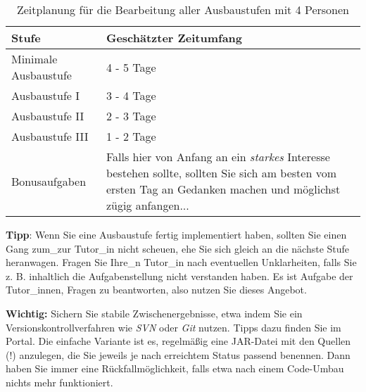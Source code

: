 \begin{table}[htb]
\begin{center}
\begin{tabular}{|p{}|p{}|}\hline
\textbf{Stufe} & \textbf{Gesch\"atzter Zeitumfang}\\\hline\hline
   Minimale Ausbaustufe & 4 - 5 Tage \\\hline

   Ausbaustufe I & 3 - 4 Tage \\\hline

   Ausbaustufe II & 2 - 3 Tage \\\hline

   Ausbaustufe III & 1 - 2 Tage \\\hline

   Bonusaufgaben & Falls hier von Anfang an ein \emph{starkes} Interesse bestehen
   sollte, sollten Sie sich am besten vom ersten Tag an Gedanken machen und m\"oglichst z\"ugig anfangen...\\\hline
\end{tabular}
\caption{Zeitplanung f\"ur die Bearbeitung aller Ausbaustufen mit 4 Personen}
\label{tab:zeitplanAlles}
\end{center}
\end{table}

\textbf{Tipp}: Wenn Sie eine Ausbaustufe fertig implementiert haben, sollten Sie
einen Gang zum\_zur Tutor\_in nicht scheuen, ehe Sie sich gleich an die n\"achste Stufe
heranwagen. Fragen Sie Ihre\_n Tutor\_in nach eventuellen Unklarheiten, falls Sie z. B.
inhaltlich die Aufgabenstellung nicht verstanden haben. Es ist Aufgabe der Tutor\_innen,
Fragen zu beantworten, also nutzen Sie dieses Angebot.

\textbf{Wichtig:} \glqq{}Sichern\grqq{} Sie stabile Zwischenergebnisse, etwa indem
Sie ein Versionskontrollverfahren wie \emph{SVN} oder \emph{Git} nutzen. Tipps dazu
finden Sie im Portal. Die einfache Variante ist es, regelm\"a\ss{}ig eine JAR-Datei
mit den Quellen (!) anzulegen, die Sie jeweils je nach erreichtem Status \glqq{}passend\grqq{}
benennen. Dann haben Sie immer eine R\"uckfallm\"oglichkeit, falls etwa nach einem Code-Umbau nichts mehr funktioniert.

